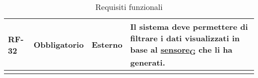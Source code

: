 \begin{longtable}{|>{\centering\arraybackslash}m{}|>{\centering\arraybackslash}m{}|>{\centering\arraybackslash}m{}|>{\centering\arraybackslash}m{}|}
	RF-32           & Obbligatorio        & Esterno                                                                                                           & Il sistema deve permettere di filtrare i dati visualizzati in base al \href{https://7last.github.io/docs/rtb/documentazione-interna/glossario\#sensore}{sensore\textsubscript{G}} che li ha generati.                                                                                                                                                                                                                                                                                                                                                                                                    \\\hline
	\caption{Requisiti funzionali}
	\label{table:1}
\end{longtable}


